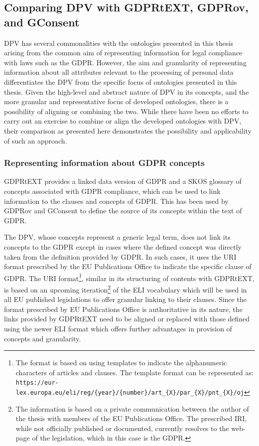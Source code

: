\subsection{Comparing DPV with GDPRtEXT, GDPRov, and GConsent}
DPV has several commonalities with the ontologies presented in this thesis arising from the common aim of representing information for legal compliance with laws such as the GDPR.
However, the aim and granularity of representing information about all attributes relevant to the processing of personal data differentiates the DPV from the specific focus of ontologies presented in this thesis.
Given the high-level and abstract nature of DPV in its concepts, and the more granular and representative focus of developed ontologies, there is a possibility of aligning or combining the two.
While there have been no efforts to carry out an exercise to combine or align the developed ontologies with DPV, their comparison as presented here demonstrates the possibility and applicability of such an approach.

\subsubsection{Representing information about GDPR concepts}
GDPRtEXT provides a linked data version of GDPR and a SKOS glossary of concepts associated with GDPR compliance, which can be used to link information to the clauses and concepts of GDPR.
This has been used by GDPRov and GConsent to define the source of its concepts within the text of GDPR.

The DPV, whose concepts represent a generic legal term, does not link its concepts to the GDPR except in cases where the defined concept was directly taken from the definition provided by GDPR.
In such cases, it uses the URI format prescribed by the EU Publications Office to indicate the specific clause of GDPR. The URI format\footnote{The format is based on using templates to indicate the alphanumeric characters of articles and clauses. The template format can be represented as: \texttt{https://eur-lex.europa.eu/eli/reg/\{year\}/\{number\}/art\_\{X\}/par\_\{X\}/pnt\_\{X\}/oj}}, similar in its structuring of contents with GDPRtEXT, is based on an upcoming iteration\footnote{The information is based on a private communication between the author of the thesis with members of the EU Publications Office. The prescribed IRI, while not officially published or documented, currently resolves to the web-page of the legislation, which in this case is the GDPR.} of the ELI vocabulary which will be used in all EU published legislations to offer granular linking to their clauses.
Since the format prescribed by EU Publications Office is authoritative in its nature, the links provided by GDPRtEXT need to be aligned or replaced with those defined using the newer ELI format which offers further advantages in provision of concepts and granularity.

